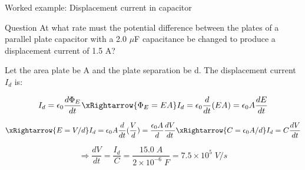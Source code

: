 %
%

{
\problemslide

%
%
%

\begin{frame}{Worked example: Displacement current in capacitor}

  \begin{blockexmplque}{Question}
    At what rate must the potential difference between the plates
    of a parallel plate capacitor with a 2.0 $\mu$F capacitance
    be changed to produce a displacement current of 1.5 A?
  \end{blockexmplque}

  Let the area plate be A and the plate separation be d.
  The displacement current $I_{d}$ is:

  \begin{equation*}
    I_{d} = \epsilon_0 \frac{d\Phi_{E}}{dt}
    \xRightarrow{\Phi_{E} = EA}
    I_{d} = \epsilon_0 \frac{d}{dt} (EA)
          = \epsilon_0 A \frac{dE}{dt}
  \end{equation*}

  \begin{equation*}
    \xRightarrow{E = V/d}
    I_{d} = \epsilon_0 A \frac{d}{dt} (\frac{V}{d})
          = \frac{\epsilon_0 A}{d} \frac{dV}{dt}
    \xRightarrow{C = \epsilon_0 A/d}
    I_{d} = C \frac{dV}{dt}
  \end{equation*}

  \begin{equation*}
    \Rightarrow
     \frac{dV}{dt} = \frac{I_{d}}{C}
                   = \frac{15.0 \; A}{2 \times 10^{-6} \; F}
                   = 7.5 \times 10^{5} \; V/s
  \end{equation*}

\end{frame}

} %


%
%

